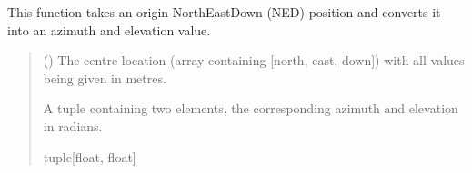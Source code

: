 \documentclass[letterpaper,10pt,english]{sphinxmanual}
\begin{document}
\begin{fulllineitems}
\label{\detokenize{modules/util/transformations:qnav.util.transformations.ned2azel}}
\pysigstartsignatures
{}
\pysigstopsignatures
\sphinxAtStartPar
This function takes an origin North\sphinxhyphen{}East\sphinxhyphen{}Down (NED) position and converts
it into an azimuth and elevation value.
\begin{quote}\begin{description}
\sphinxAtStartPar
{} (\sphinxstyleliteralemphasis{\sphinxupquote{ (}}\sphinxstyleliteralemphasis{\sphinxupquote{)}}) \textendash{} The centre location (array containing {[}north, east, down{]})
with all values being given in metres.

\sphinxAtStartPar
A tuple containing two elements, the corresponding azimuth and
elevation in radians.

\sphinxAtStartPar
tuple{[}float, float{]}

\end{description}\end{quote}

\end{fulllineitems}

\end{document}
